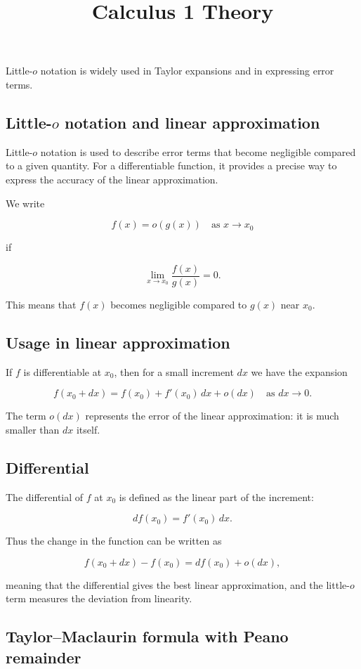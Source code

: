 \documentclass[11pt,a4paper]{article} \usepackage[T1]{fontenc}
\theoremstyle{plain} \newtheorem{theorem}{Theorem} \title{Calculus 1 Theory}
\begin{document}
Little-$o$ notation is widely used in Taylor expansions and in expressing error
terms.

\subsection*{Little-$o$ notation and linear approximation}

Little-$o$ notation is used to describe error terms that become negligible
compared to a given quantity. For a differentiable function, it provides a
precise way to express the accuracy of the linear approximation.

\begin{definition}
 We write

\[
f(x) = o(g(x)) \quad \text{as } x \to x_0
\]

if

\[
\lim_{x \to x_0} \frac{f(x)}{g(x)} = 0.
\]

This means that $f(x)$ becomes negligible compared to $g(x)$ near $x_0$.
\end{definition}

\subsection*{Usage in linear approximation}

If $f$ is differentiable at $x_0$, then for a small increment $dx$ we have the
expansion

\[
f(x_0 + dx) = f(x_0) + f'(x_0)\,dx + o(dx) \quad \text{as } dx \to 0.
\]

The term $o(dx)$ represents the error of the linear approximation: it is much
smaller than $dx$ itself.

\subsection*{Differential}

The differential of $f$ at $x_0$ is defined as the linear part of the
increment:

\[
df(x_0) = f'(x_0)\,dx.
\]

Thus the change in the function can be written as

\[
f(x_0 + dx) - f(x_0) = df(x_0) + o(dx),
\]

meaning that the differential gives the best linear approximation, and the
little-$o$ term measures the deviation from linearity.

\subsection {Taylor--Maclaurin formula with Peano remainder}
\end{document}
